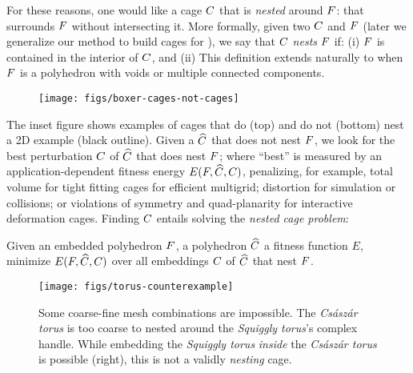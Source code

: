 For these reasons, one would like a cage $C$ that is \emph{nested} around
$F$: that surrounds $F$ without intersecting it. More formally, given
two 
%
$C$ and $F$ (later we generalize our method to build cages for ), we say that $C$ \emph{nests} $F$ if: 
%
(i) $F$ is contained in the interior of $C$, and 
%
(ii) 
This definition extends naturally to when $F$ is a polyhedron with voids or multiple connected components.

\begin{wrapfigure}[14]{r}{1.02in}
%
\centering
%
\vspace{-0.7cm}
\texttt{[image: figs/boxer-cages-not-cages]}
%
\end{wrapfigure}
%
The inset figure shows examples of cages that do (top) and do not (bottom) nest
a 2D example (black outline). Given a $\widehat{C}$ that does not nest $F$, we
look for the best perturbation $C$ of $\widehat{C}$ that does nest $F$; where
``best'' is measured by an application-dependent fitness energy $E(F,
\widehat{C}, C)$, penalizing, for example, total volume for tight fitting cages
for efficient multigrid; distortion for simulation or collisions; or violations
of symmetry and quad-planarity for interactive deformation cages.  Finding
$C$ entails solving the \emph{nested cage problem}:

Given an embedded polyhedron $F$, a polyhedron $\widehat{C}$ a
fitness function $E$,  minimize $E(F, \widehat{C}, C)$ over all embeddings
$C$ of $\widehat{C}$ that nest $F$.


\begin{figure}
  \texttt{[image: figs/torus-counterexample]}
  \caption{Some coarse-fine mesh combinations are impossible. The
  \emph{Cs\'asz\'ar torus} is too coarse to nested around the
  \emph{Squiggly torus}'s complex handle. While embedding the \emph{Squiggly
  torus} \emph{inside} the \emph{Cs\'asz\'ar torus} is possible (right), this
  is not a validly \emph{nesting} cage.}
  \label{fig:torus-counterexample}
\end{figure}

